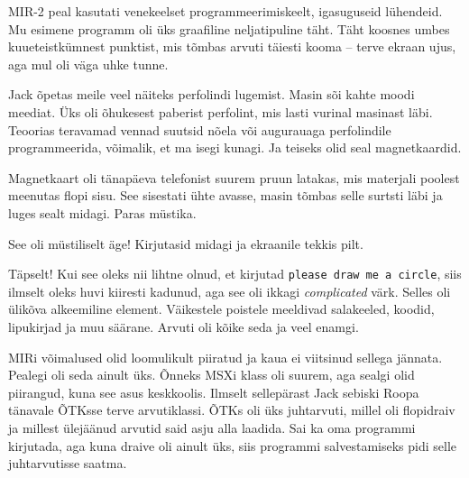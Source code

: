 MIR-2 peal kasutati venekeelset programmeerimiskeelt, igasuguseid
lühendeid. Mu esimene programm oli üks graafiline neljatipuline täht. Täht
koosnes umbes kuueteistkümnest punktist, mis 
tõmbas arvuti täiesti kooma – terve ekraan ujus, aga mul oli väga uhke tunne. 

Jack õpetas meile veel näiteks 
perfolindi lugemist. Masin sõi kahte moodi meediat. Üks oli õhukesest paberist perfolint, mis lasti vurinal masinast läbi. Teoorias teravamad vennad 
suutsid nõela või augurauaga perfolindile programmeerida, võimalik, et ma isegi kunagi. Ja teiseks olid seal magnetkaardid. 


Magnetkaart oli tänapäeva telefonist suurem pruun latakas, mis materjali poolest meenutas flopi sisu. See sisestati ühte
avasse, masin tõmbas selle 
surtsti läbi ja luges sealt midagi. Paras müstika. 


See oli müstiliselt äge! Kirjutasid midagi ja ekraanile 
tekkis pilt.


Täpselt! Kui see oleks nii lihtne olnud, et kirjutad \verb|please draw me a circle|, 
siis ilmselt oleks huvi kiiresti kadunud, aga see oli ikkagi \emph{complicated} värk. 
Selles oli ülikõva alkeemiline element. Väikestele poistele 
meeldivad salakeeled, koodid, lipukirjad ja muu säärane. Arvuti
oli kõike seda ja veel enamgi.

MIRi võimalused olid loomulikult piiratud ja kaua ei viitsinud sellega
jännata. Pealegi oli seda ainult üks. Õnneks MSXi klass oli
suurem, aga sealgi olid piirangud, kuna see asus 
keskkoolis. Ilmselt sellepärast Jack sebiski 
Roopa tänavale ÕTKsse terve arvutiklassi. ÕTKs oli üks
juhtarvuti, millel oli flopidraiv ja millest ülejäänud arvutid said 
asju alla laadida. Sai ka oma programmi kirjutada, aga kuna 
draive oli ainult üks, siis programmi salvestamiseks pidi selle 
juhtarvutisse saatma. 

